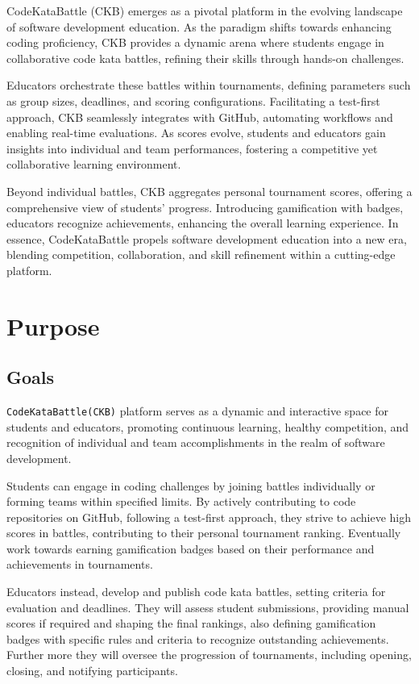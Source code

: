 CodeKataBattle (CKB) emerges as a pivotal platform in the evolving landscape of software development education. 
As the paradigm shifts towards enhancing coding proficiency, CKB provides a dynamic arena where students engage in collaborative code kata battles, 
refining their skills through hands-on challenges. 

Educators orchestrate these battles within tournaments, defining parameters such as group sizes, deadlines, and scoring configurations. 
Facilitating a test-first approach, CKB seamlessly integrates with GitHub, automating workflows and enabling real-time evaluations. 
As scores evolve, students and educators gain insights into individual and team performances, fostering a competitive yet collaborative learning environment. 

Beyond individual battles, CKB aggregates personal tournament scores, offering a comprehensive view of students' progress. 
Introducing gamification with badges, educators recognize achievements, enhancing the overall learning experience. 
In essence, CodeKataBattle propels software development education into a new era, blending competition, collaboration, and skill refinement within a cutting-edge platform.
\newpage


\section{Purpose}
\label{sec:purpose}%

\subsection{Goals}
\label{subsec:goals}%
\setcounter{g}{1}
\newcommand{\cg}{\theg\stepcounter{g}}
\verb|CodeKataBattle(CKB)| platform serves as a dynamic and interactive space for students and educators, 
promoting continuous learning, healthy competition, and recognition of individual and team accomplishments in the realm of software development.

Students can engage in coding challenges by joining battles individually or forming teams within specified limits.
By actively contributing to code repositories on GitHub, following a test-first approach, they strive to achieve high scores in battles, contributing to their personal tournament ranking.
Eventually work towards earning gamification badges based on their performance and achievements in tournaments.

Educators instead, develop and publish code kata battles, setting criteria for evaluation and deadlines.
They will assess student submissions, providing manual scores if required and shaping the final rankings, also defining gamification badges with specific rules and criteria to recognize outstanding achievements.
Further more they will oversee the progression of tournaments, including opening, closing, and notifying participants.

